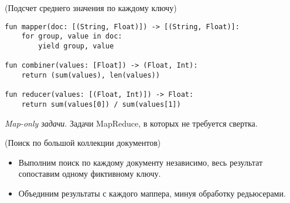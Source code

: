 \begin{example}(Подсчет среднего значения по каждому ключу)
  \begin{lstlisting}
fun mapper(doc: [(String, Float)]) -> [(String, Float)]:
    for group, value in doc:
        yield group, value

fun combiner(values: [Float]) -> (Float, Int):
    return (sum(values), len(values))

fun reducer(values: [(Float, Int)]) -> Float:
    return sum(values[0]) / sum(values[1])
  \end{lstlisting}
\end{example}

\begin{definition}
  \textit{Map-only задачи}. Задачи MapReduce, в которых не требуется свертка.
\end{definition}

\begin{example}(Поиск по большой коллекции документов)
  \begin{itemize}
    \item Выполним поиск по каждому документу независимо, весь результат
      сопоставим одному фиктивному ключу.
    \item Объединим результаты с каждого маппера, минуя обработку редьюсерами.
  \end{itemize}
\end{example}
